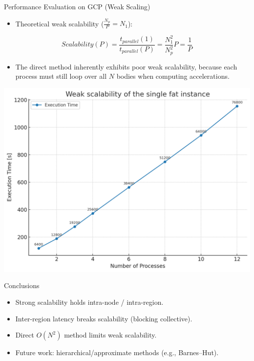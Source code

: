 \documentclass{beamer}
\begin{document}
\begin{frame}{Performance Evaluation on GCP (Weak Scaling)}
\begin{itemize}
	\item Theoretical weak scalability ($\tfrac{N_p}{P} = N_1$):
\end{itemize}
\[
Scalability(P) = \frac{t_{parallel}(1)}{t_{parallel}(P)} = \frac{N_1^2}{N_p^2}P = \frac{1}{P}
\]
\begin{itemize}
	\item The direct method inherently exhibits poor weak scalability, because each process must still loop over all $N$ bodies when computing accelerations.
\end{itemize}
  \centering
  \includegraphics[width=0.47\linewidth]{parallel_weak_scalability.png}
\end{frame}

\begin{frame}{Conclusions}
  \begin{itemize}
    \item Strong scalability holds intra-node / intra-region.
    \item Inter-region latency breaks scalability (blocking collective).
    \item Direct $O(N^2)$ method limits weak scalability.
    \item Future work: hierarchical/approximate methods (e.g., Barnes--Hut).
  \end{itemize}
\end{frame}
\end{document}
